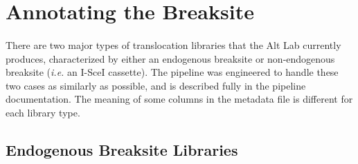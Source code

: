 \documentclass{article}
\begin{document}
\section{Annotating the Breaksite}
\paragraph{} There are two major types of translocation libraries that the Alt Lab currently produces, characterized by either an endogenous breaksite or non-endogenous breaksite (\emph{i.e.} an I-SceI cassette). The pipeline was engineered to handle these two cases as similarly as possible, and is described fully in the pipeline documentation. The meaning of some columns in the metadata file is different for each library type.

\subsection{Endogenous Breaksite Libraries}
\end{document}
